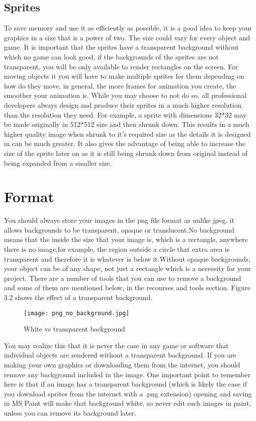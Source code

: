 \documentclass[11pt,fleqn]{book} %
\begin{document}
    \subsection{Sprites}
     To save memory and use it as efficiently as possible, it is a good idea to keep your graphics in a size that is a power of two. The size could vary for every object and game. It is important that the sprites have a transparent background without which no game can look good, if the backgrounds of the sprites are not transparent, you will be only available to render rectangles on the screen. For moving objects it you will have to make multiple sprites for them depending on how do they move, in general, the more frames for animation you create, the smoother your animation is. \newline
     While you may choose to not do so, all professional developers always design and produce their sprites in a much higher resolution than the resolution they need. For example, a sprite with dimensions 32*32 may be made originally in 512*512 size and then shrunk down. This results in a much higher quality image when shrunk to it's required size as the details it is designed in can be much greater. It also gives the advantage of being able to increase the size of the sprite later on as it is still being shrunk down from original instead of being expanded from a smaller size.
     
\section{Format}
        You should always store your images in the png file format as unlike jpeg, it allows backgrounds to be transparent, opaque or translucent.No background means that the inside the size that your image is, which is a rectangle, anywhere there is no image,for example, the region outside a circle that extra area is transparent and therefore it is whatever is below it.Without opaque backgrounds, your object can be of any shape, not just a rectangle which is a necessity for your project. There are a number of tools that you can use to remove a background and some of them are mentioned below, in the recourses and tools section. Figure 3.2 shows the effect of a transparent background.
        \begin{figure}[ht]
            \centering
            \texttt{[image: png\_no\_background.jpg]}
            \caption{White vs transparent background}
            \label{fig:my_label}
        \end{figure}
        \newline
   You may realize this that it is never the case in any game or software that individual objects are rendered without a transparent background. If you are making your own graphics or downloading them from the internet, you should remove any background included in the image. One important point to remember here is that if an image has a transparent background (which is likely the case if you download sprites from the internet with a .png extension) opening and saving in MS Paint will make that background white, so never edit such images in paint, unless you can remove its background later.
        
\end{document}
